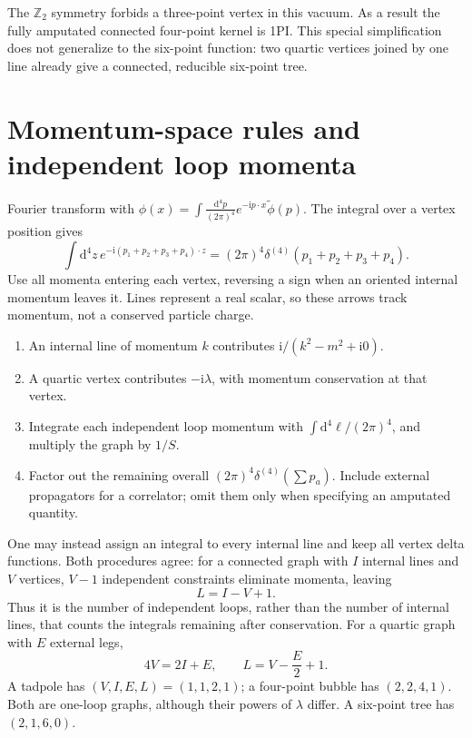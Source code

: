 \documentclass[11pt]{article}
\newcommand{\dd}{\mathrm d}
\newcommand{\ii}{\mathrm i}
\newcommand{\intp}{\int\!\frac{\dd^4p}{(2\pi)^4}}
\newcommand{\module}[1]{\clearpage\section{#1}}
\begin{document}
The \(\mathbb Z_2\) symmetry forbids a three-point vertex in this vacuum.
As a result the fully amputated connected four-point kernel is 1PI.
This special simplification does not generalize to the six-point
function: two quartic vertices joined by one line already give a
connected, reducible six-point tree.

\module{Momentum-space rules and independent loop momenta}
Fourier transform with \(\phi(x)=\intp e^{-\ii p\cdot x}\widetilde\phi(p)\).
The integral over a vertex position gives
\begin{equation}
 \int\dd^4z\,e^{-\ii(p_1+p_2+p_3+p_4)\cdot z}
 =(2\pi)^4\delta^{(4)}(p_1+p_2+p_3+p_4).
\end{equation}
Use all momenta entering each vertex, reversing a sign when an oriented
internal momentum leaves it. Lines represent a real scalar, so these
arrows track momentum, not a conserved particle charge.

\begin{keyidea}
\begin{enumerate}
\item An internal line of momentum \(k\) contributes
\(\ii/(k^2-m^2+\ii0)\).
\item A quartic vertex contributes \(-\ii\lambda\), with momentum
conservation at that vertex.
\item Integrate each independent loop momentum with
\(\int\dd^4\ell/(2\pi)^4\), and multiply the graph by \(1/S\).
\item Factor out the remaining overall
\((2\pi)^4\delta^{(4)}(\sum p_a)\). Include external propagators for a
correlator; omit them only when specifying an amputated quantity.
\end{enumerate}
\end{keyidea}
One may instead assign an integral to every internal line and keep all
vertex delta functions. Both procedures agree: for a connected graph
with \(I\) internal lines and \(V\) vertices, \(V-1\) independent
constraints eliminate momenta, leaving
\begin{equation}
 L=I-V+1.                                         \label{eq:loops}
\end{equation}
Thus it is the number of independent loops, rather than the number of
internal lines, that counts the integrals remaining after conservation.
For a quartic graph with \(E\) external legs,
\begin{equation}
 4V=2I+E,\qquad L=V-\frac E2+1.                  \label{eq:topology}
\end{equation}
A tadpole has \((V,I,E,L)=(1,1,2,1)\); a four-point bubble has
\((2,2,4,1)\). Both are one-loop graphs, although their powers of
\(\lambda\) differ. A six-point tree has \((2,1,6,0)\).
\end{document}
